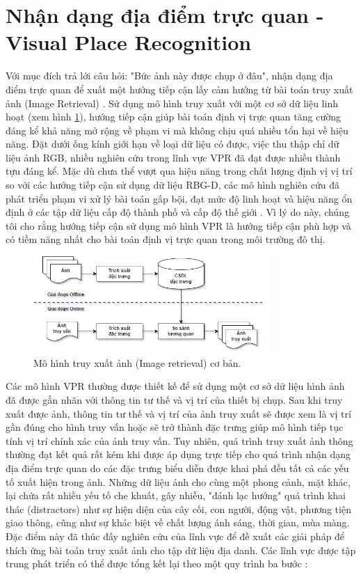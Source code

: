 \section{Nhận dạng địa điểm trực quan - Visual Place Recognition}

Với mục đích trả lới câu hỏi: "Bức ảnh này được chụp ở đâu", nhận dạng địa điểm trực quan để xuất một hướng tiếp cận lấy cảm hướng từ bài toán truy xuất ảnh (Image Retrieval) \cite{2022arXiv220105816X}. Sử dụng mô hình truy xuất với một cơ sở dữ liệu linh hoạt (xem hình \ref{fig:ir}), hướng tiếp cận giúp bài toán định vị trực quan tăng cường đáng kể khả năng mở rộng về phạm vi mà không chịu quá nhiều tổn hại về hiệu năng. Đặt dưới ống kính giới hạn về loại dữ liệu có được, việc thu thập chỉ dữ liệu ảnh RGB, nhiều nghiên cứu trong lĩnh vực VPR đã đạt được nhiều thành tựu đáng kể. Mặc dù chưa thể vượt qua hiệu năng trong chất lượng định vị vị trí so với các hướng tiếp cận sử dụng dữ liệu RBG-D, các mô hình nghiên cứu đã phát triển phạm vi xử lý bài toán gấp bội, đạt mức độ linh hoạt và hiệu năng ổn định ở các tập dữ liệu cấp độ thành phố \cite{alibey2023mixvpr} và cấp độ thế giới \cite{keetha2023anyloc}. Vì lý do này, chúng tôi cho rằng hướng tiếp cận sử dụng mô hình VPR là hướng tiếp cận phù hợp và có tiềm năng nhất cho bài toán định vị trực quan trong môi trường đô thị.

\begin{figure}[H]
    \centering
    \includegraphics[width=0.8\textwidth]{pics/Chapter2/IR.drawio.png}
    \caption[Mô hình truy xuất ảnh cơ bản]{Mô hình truy xuất ảnh (Image retrieval) cơ bản.}
    \label{fig:ir}
\end{figure}

Các mô hình VPR thường được thiết kế để sử dụng một cơ sở dữ liệu hình ảnh đã được gắn nhãn với thông tin tư thế và vị trí của thiết bị chụp. Sau khi truy xuất được ảnh, thông tin tư thế và vị trí của ảnh truy xuất sẽ được xem là vị trí gần đúng cho hình truy vấn hoặc sẽ trở thành đặc trưng giúp mô hình tiếp tục tính vị trí chính xác của ảnh truy vấn. Tuy nhiên, quá trình truy xuất ảnh thông thường đạt kết quả rất kém khi được áp dụng trực tiếp cho quá trình nhận dạng địa điểm trực quan do các đặc trưng biểu diễn được khai phá đều tất cả các yếu tố xuất hiện trong ảnh. Những dữ liệu ảnh cho cùng một phong cảnh, mặt khác, lại chứa rất nhiều yếu tố che khuất, gây nhiễu, "đánh lạc hướng" quá trình khai thác (distractors) như sự hiện diện của cây cối, con người, động vật, phương tiện giao thông, cũng như sự khác biệt về chất lượng ánh sáng, thời gian, mùa màng. Đặc điểm này đã thúc đấy nghiên cứu của lĩnh vực để đề xuất các giải pháp để thích ứng bài toán truy xuất ảnh cho tập dữ liệu địa danh. Các lĩnh vực được tập trung phát triển có thể được tổng kết lại theo một quy trình ba bước \cite{Masone2021ASO}:

